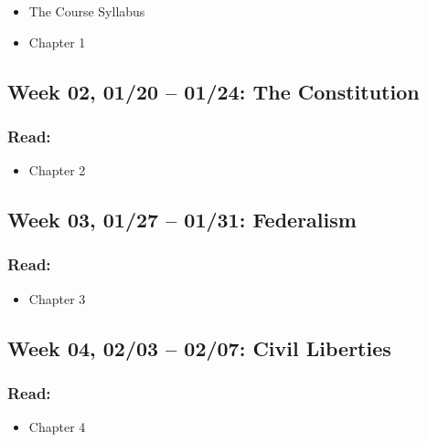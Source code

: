 \documentclass[11pt,]{article}
\providecommand{\tightlist}{%
  \setlength{\itemsep}{0pt}\setlength{\parskip}{0pt}}
\begin{document}
\begin{itemize}
\item
  The Course Syllabus
\item
  Chapter 1
\end{itemize}

\hypertarget{week-02-0120-0124-the-constitution}{%
\subsection{Week 02, 01/20 -- 01/24: The
Constitution}\label{week-02-0120-0124-the-constitution}}

\hypertarget{read-1}{%
\subsubsection{Read:}\label{read-1}}

\begin{itemize}
\tightlist
\item
  Chapter 2
\end{itemize}

\hypertarget{week-03-0127-0131-federalism}{%
\subsection{Week 03, 01/27 -- 01/31:
Federalism}\label{week-03-0127-0131-federalism}}

\hypertarget{read-2}{%
\subsubsection{Read:}\label{read-2}}

\begin{itemize}
\tightlist
\item
  Chapter 3
\end{itemize}

\hypertarget{week-04-0203-0207-civil-liberties}{%
\subsection{Week 04, 02/03 -- 02/07: Civil
Liberties}\label{week-04-0203-0207-civil-liberties}}

\hypertarget{read-3}{%
\subsubsection{Read:}\label{read-3}}

\begin{itemize}
\tightlist
\item
  Chapter 4
\end{itemize}
\end{document}
